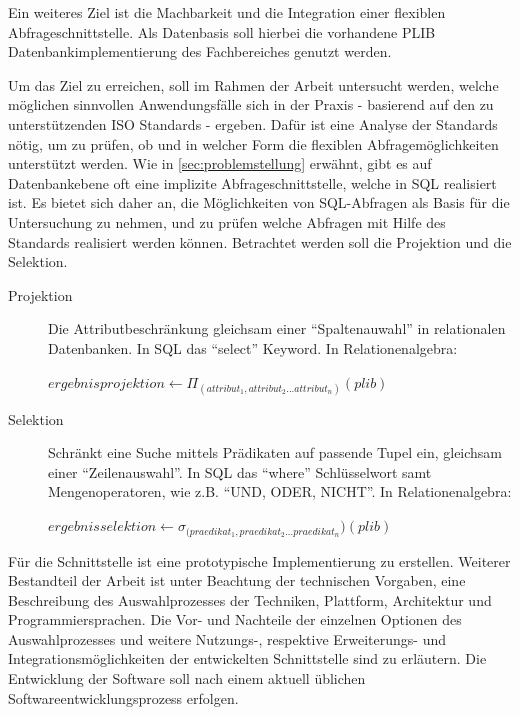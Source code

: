 Ein weiteres Ziel ist die Machbarkeit und die Integration einer flexiblen \gls{Abfrageschnittstelle}. Als Datenbasis soll hierbei die vorhandene \gls{PLIB} Datenbankimplementierung des Fachbereiches genutzt werden. 

Um das Ziel zu erreichen, soll im Rahmen der Arbeit untersucht werden, welche möglichen sinnvollen Anwendungsfälle sich in der Praxis - basierend auf den zu unterstützenden ISO Standards - ergeben. Dafür ist eine Analyse der Standards nötig, um zu prüfen, ob und in welcher Form die flexiblen Abfragemöglichkeiten unterstützt werden. Wie in \autoref{sec:problemstellung} erwähnt, gibt es auf Datenbankebene oft eine implizite Abfrageschnittstelle, welche in SQL realisiert ist. Es bietet sich daher an, die Möglichkeiten von SQL-Abfragen als Basis für die Untersuchung zu nehmen, und zu prüfen welche Abfragen mit Hilfe des Standards realisiert werden können. 
Betrachtet werden soll die Projektion und die Selektion.

\begin{description}
\item[Projektion] Die Attributbeschränkung gleichsam einer \enquote{Spaltenauwahl} in relationalen Datenbanken. In SQL das \enquote{select} Keyword. In Relationenalgebra:

$ergebnisprojektion \leftarrow  \Pi_{(attribut_1, attribut_2... attribut_n)}(plib)$ \\

\item[Selektion] Schränkt eine Suche mittels Prädikaten auf passende Tupel ein, gleichsam einer \enquote{Zeilenauswahl}. In SQL das \enquote{where} Schlüsselwort samt Mengenoperatoren, wie z.B. \enquote{UND, ODER, NICHT}. In Relationenalgebra:

$ergebnisselektion \leftarrow  \sigma_{(praedikat_1, praedikat_2... praedikat_n})(plib)$ \\

\end{description}

Für die Schnittstelle ist eine prototypische Implementierung zu erstellen. Weiterer Bestandteil der Arbeit ist unter Beachtung der technischen Vorgaben, eine Beschreibung des Auswahlprozesses der Techniken, Plattform, Architektur und Programmiersprachen. Die Vor- und Nachteile der einzelnen Optionen des Auswahlprozesses und weitere Nutzungs-, respektive Erweiterungs- und Integrationsmöglichkeiten der entwickelten Schnittstelle sind zu erläutern. 
Die Entwicklung der Software soll nach einem aktuell üblichen Softwareentwicklungsprozess erfolgen. 

